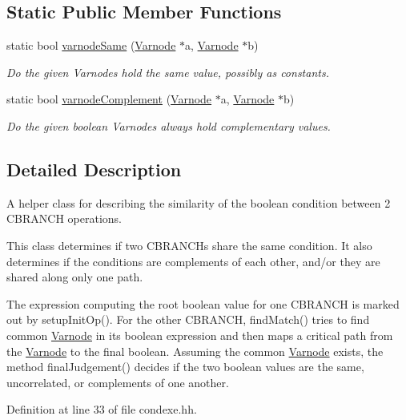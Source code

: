 \subsection*{Static Public Member Functions}
\begin{DoxyCompactItemize}
\item 
static bool \mbox{\hyperlink{class_condition_marker_ab142a297ad508117562f6cdb323177b3}{varnode\+Same}} (\mbox{\hyperlink{class_varnode}{Varnode}} $\ast$a, \mbox{\hyperlink{class_varnode}{Varnode}} $\ast$b)
\begin{DoxyCompactList}\small\item\em Do the given Varnodes hold the same value, possibly as constants. \end{DoxyCompactList}\item 
static bool \mbox{\hyperlink{class_condition_marker_a51982c64eb3d581be8276d96b4735a23}{varnode\+Complement}} (\mbox{\hyperlink{class_varnode}{Varnode}} $\ast$a, \mbox{\hyperlink{class_varnode}{Varnode}} $\ast$b)
\begin{DoxyCompactList}\small\item\em Do the given boolean Varnodes always hold complementary values. \end{DoxyCompactList}\end{DoxyCompactItemize}


\subsection{Detailed Description}
A helper class for describing the similarity of the boolean condition between 2 C\+B\+R\+A\+N\+CH operations. 

This class determines if two C\+B\+R\+A\+N\+C\+Hs share the same condition. It also determines if the conditions are complements of each other, and/or they are shared along only one path.

The expression computing the root boolean value for one C\+B\+R\+A\+N\+CH is marked out by setup\+Init\+Op(). For the other C\+B\+R\+A\+N\+CH, find\+Match() tries to find common \mbox{\hyperlink{class_varnode}{Varnode}} in its boolean expression and then maps a critical path from the \mbox{\hyperlink{class_varnode}{Varnode}} to the final boolean. Assuming the common \mbox{\hyperlink{class_varnode}{Varnode}} exists, the method final\+Judgement() decides if the two boolean values are the same, uncorrelated, or complements of one another. 

Definition at line 33 of file condexe.\+hh.



